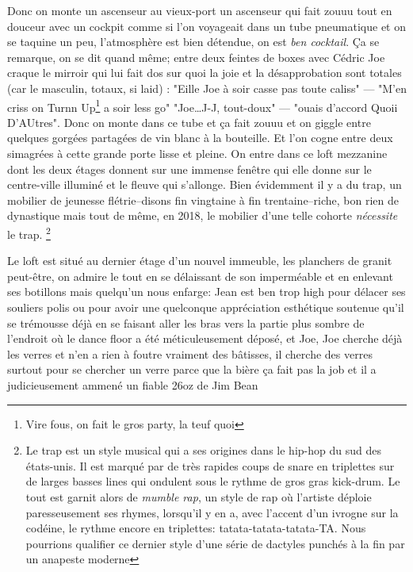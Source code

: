 Donc on monte un ascenseur au vieux-port un ascenseur qui fait zouuu tout en
douceur avec un cockpit comme si l'on voyageait dans un tube pneumatique et
on se taquine un peu, l'atmosphère est bien détendue, on est \emph{ben cocktail}.
Ça se remarque, on se dit quand même; entre deux feintes de boxes avec
Cédric Joe craque le mirroir qui lui fait dos sur quoi la joie et la
désapprobation sont totales (car le masculin, totaux, si laid) : "Eille Joe à soir casse pas toute caliss" --- "M'en
criss on Turnn Up\footnote{Vire fous, on fait le gros party, la teuf quoi} a
soir less go" "Joe\ldots J-J, tout-doux" --- "ouais d'accord Quoii
D'AUtres".  Donc on monte dans ce tube et ça fait zouuu et on giggle entre
quelques gorgées partagées de vin blanc à la bouteille. Et l'on cogne entre
deux simagrées à cette grande porte lisse et pleine. On entre dans ce loft
mezzanine dont les deux étages donnent sur une immense fenêtre qui elle
donne sur le centre-ville illuminé et le fleuve qui s'allonge.  Bien évidemment
il y a du trap, un mobilier de jeunesse flétrie--disons fin vingtaine à fin
trentaine--riche, bon rien de dynastique mais tout de même, en 2018, le
mobilier d'une telle cohorte \emph{nécessite} le trap.  \footnote{Le trap est un style musical qui a ses origines dans le
        hip-hop du sud des états-unis. Il est marqué par de très rapides coups
        de snare en triplettes sur de larges basses lines qui ondulent sous le
        rythme de gros gras kick-drum.  Le tout est garnit alors de
        \textit{mumble rap}, un style de rap où l'artiste déploie paresseusement
        ses rhymes, lorsqu'il y en a, avec l'accent d'un ivrogne sur la codéine,
        le rythme encore en triplettes: tatata-tatata-tatata-TA.  Nous pourrions
        qualifier ce dernier style d'une série de dactyles punchés à la fin par
un anapeste moderne} 

Le loft est situé au dernier étage d'un nouvel immeuble, les planchers de granit peut-être, on admire
le tout en se délaissant de son imperméable et en enlevant ses botillons
mais quelqu'un nous enfarge: Jean est ben trop high pour délacer ses souliers
polis ou pour avoir une quelconque appréciation esthétique soutenue 
qu'il se trémousse déjà en se faisant aller les bras vers la partie
plus sombre de l'endroit où le dance floor a été méticuleusement déposé, et
Joe, Joe cherche déjà les verres et n'en a rien à foutre vraiment des bâtisses,
il cherche des
verres surtout pour se chercher un verre parce que la bière ça fait pas la job
et il a judicieusement ammené un fiable 26oz de Jim Bean 
\begin{comment}Le Jim
    Bean est un whiskey, un bourbon pour être plus précis, connu comme étant
    typiffiant de l'amérique avec un gros r sale, d'une toxicité masculine, avec
    sa bouteille nettement carrée et son petit coup de coude en fin de gorgée,
il est pas mal quand même.  Et pour le prix, pour le prix\ldots 
\end{comment}

